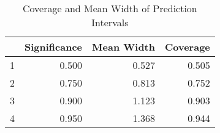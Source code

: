 \begin{table}[ht]
\centering
\begin{tabular}{rrrr}
  \toprule
 & Significance & Mean Width & Coverage \\ 
  \midrule
1 & 0.500 & 0.527 & 0.505 \\ 
  2 & 0.750 & 0.813 & 0.752 \\ 
  3 & 0.900 & 1.123 & 0.903 \\ 
  4 & 0.950 & 1.368 & 0.944 \\ 
   \bottomrule
\end{tabular}
\caption{Coverage and Mean Width of Prediction Intervals} 
\end{table}
